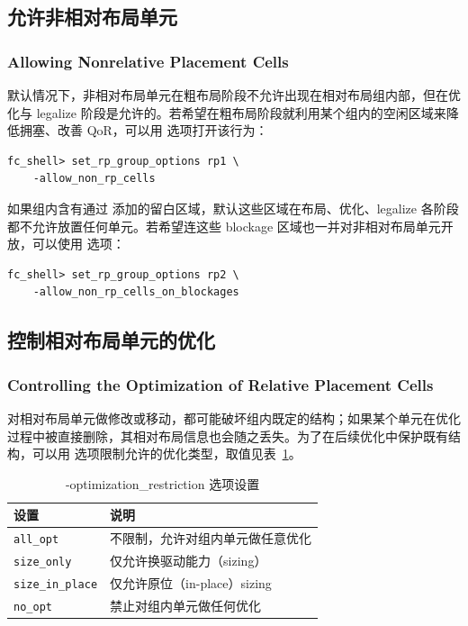 \subsection{允许非相对布局单元}
\subsubsection*{Allowing Nonrelative Placement Cells}

默认情况下，非相对布局单元在粗布局阶段不允许出现在相对布局组内部，但在优化与 legalize 阶段是允许的。若希望在粗布局阶段就利用某个组内的空闲区域来降低拥塞、改善 QoR，可以用  选项打开该行为：
\begin{lstlisting}
fc_shell> set_rp_group_options rp1 \
    -allow_non_rp_cells
\end{lstlisting}

如果组内含有通过  添加的留白区域，默认这些区域在布局、优化、legalize 各阶段都不允许放置任何单元。若希望连这些 blockage 区域也一并对非相对布局单元开放，可以使用  选项：
\begin{lstlisting}
fc_shell> set_rp_group_options rp2 \
    -allow_non_rp_cells_on_blockages
\end{lstlisting}

\subsection{控制相对布局单元的优化}
\subsubsection*{Controlling the Optimization of Relative Placement Cells}

对相对布局单元做修改或移动，都可能破坏组内既定的结构；如果某个单元在优化过程中被直接删除，其相对布局信息也会随之丢失。为了在后续优化中保护既有结构，可以用  选项限制允许的优化类型，取值见表~\ref{tab:rp-opt-restrict}。

\begin{table}[htbp]
\centering
\caption{-optimization\_restriction 选项设置}
\label{tab:rp-opt-restrict}
\begin{tabularx}{\textwidth}{lX}
\toprule
设置 & 说明 \\
\midrule
\texttt{all\_opt} & 不限制，允许对组内单元做任意优化 \\
\texttt{size\_only} & 仅允许换驱动能力（sizing） \\
\texttt{size\_in\_place} & 仅允许原位（in-place）sizing \\
\texttt{no\_opt} & 禁止对组内单元做任何优化 \\
\bottomrule
\end{tabularx}
\end{table}

